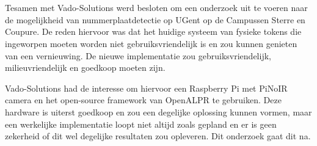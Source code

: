 
%
%

%



\chapter*{}

Tesamen met Vado-Solutions werd besloten om een onderzoek uit te voeren naar de mogelijkheid van nummerplaatdetectie op UGent op de Campussen Sterre en Coupure. De reden hiervoor was dat het huidige systeem van fysieke tokens die ingeworpen moeten worden niet gebruiksvriendelijk is en zou kunnen genieten van een vernieuwing. De nieuwe implementatie zou gebruiksvriendelijk, milieuvriendelijk en goedkoop moeten zijn.

Vado-Solutions had de interesse om hiervoor een Raspberry Pi met PiNoIR camera en het open-source framework van OpenALPR te gebruiken. Deze hardware is uiterst goedkoop en zou een degelijke oplossing kunnen vormen, maar een werkelijke implementatie loopt niet altijd zoals gepland en er is geen zekerheid of dit wel degelijke resultaten zou opleveren. Dit onderzoek gaat dit na.

